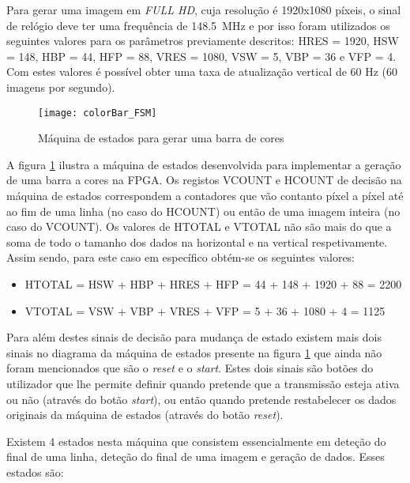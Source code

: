 Para gerar uma imagem em \textit{FULL HD}, cuja resolução é 1920x1080 píxeis, o sinal de relógio deve ter uma frequência de \SI{148.5}{\mega\hertz} e por isso foram utilizados os seguintes valores para os parâmetros previamente descritos: HRES = 1920, HSW = 148, HBP = 44, HFP = 88,  VRES = 1080, VSW = 5, VBP = 36 e VFP = 4. Com estes valores é possível obter uma taxa de atualização vertical de 60 Hz (60 imagens por segundo).

\begin{figure}[h!]
	\begin{center}
		\leavevmode
		\texttt{[image: colorBar\_FSM]}
		\caption{Máquina de estados para gerar uma barra de cores}
		\label{fig:colorBar_fsm}
	\end{center}
\end{figure}

A figura \ref{fig:colorBar_fsm} ilustra a máquina de estados desenvolvida para implementar a geração de uma barra a cores na FPGA. Os registos VCOUNT e HCOUNT de decisão na máquina de estados correspondem a contadores que vão contanto píxel a píxel até ao fim de uma linha (no caso do HCOUNT) ou então de uma imagem inteira (no caso do VCOUNT). Os valores de HTOTAL e VTOTAL não são mais do que a soma de todo o tamanho dos dados na horizontal e na vertical respetivamente. Assim sendo, para este caso em específico obtém-se os seguintes valores:
\begin{itemize}
	\item HTOTAL = HSW + HBP + HRES + HFP = 44 + 148 + 1920 + 88 = 2200
	\item VTOTAL = VSW + VBP + VRES + VFP = 5 + 36 + 1080 + 4 = 1125
\end{itemize}


Para além destes sinais de decisão para mudança de estado existem mais dois sinais no diagrama da máquina de estados presente na figura \ref{fig:colorBar_fsm} que ainda não foram mencionados que são o \textit{reset} e o \textit{start}. Estes dois sinais são botões do utilizador que lhe permite definir quando pretende que a transmissão esteja ativa ou não (através do botão \textit{start}), ou então quando pretende restabelecer os dados originais da máquina de estados (através do botão \textit{reset}). 

Existem 4 estados nesta máquina que consistem essencialmente em deteção do final de uma linha, deteção do final de uma imagem e geração de dados. Esses estados são:

